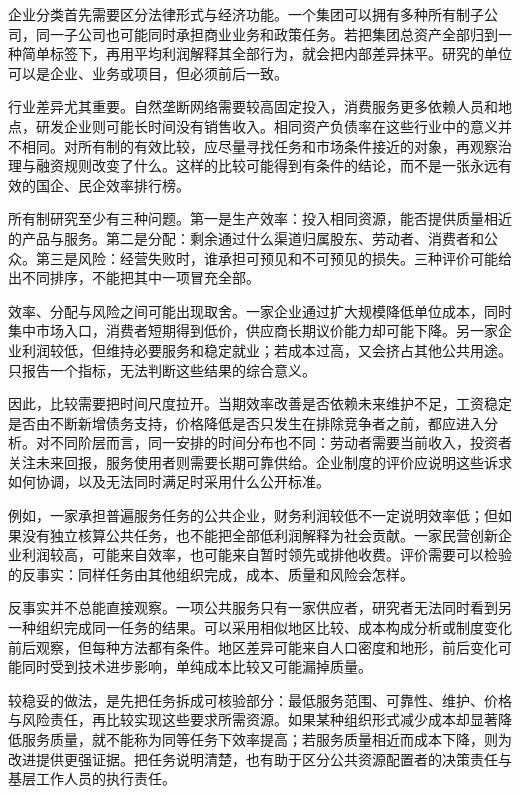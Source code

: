 \documentclass[UTF8,fontset=fandol,zihao=-4,oneside,openany]{ctexbook}
\begin{document}
\label{arg:P076}
企业分类首先需要区分法律形式与经济功能。一个集团可以拥有多种所有制子公司，同一子公司也可能同时承担商业业务和政策任务。若把集团总资产全部归到一种简单标签下，再用平均利润解释其全部行为，就会把内部差异抹平。研究的单位可以是企业、业务或项目，但必须前后一致。

行业差异尤其重要。自然垄断网络需要较高固定投入，消费服务更多依赖人员和地点，研发企业则可能长时间没有销售收入。相同资产负债率在这些行业中的意义并不相同。对所有制的有效比较，应尽量寻找任务和市场条件接近的对象，再观察治理与融资规则改变了什么。这样的比较可能得到有条件的结论，而不是一张永远有效的国企、民企效率排行榜。

所有制研究至少有三种问题。第一是生产效率：投入相同资源，能否提供质量相近的产品与服务。第二是分配：剩余通过什么渠道归属股东、劳动者、消费者和公众。第三是风险：经营失败时，谁承担可预见和不可预见的损失。三种评价可能给出不同排序，不能把其中一项冒充全部。

\label{arg:P077}
效率、分配与风险之间可能出现取舍。一家企业通过扩大规模降低单位成本，同时集中市场入口，消费者短期得到低价，供应商长期议价能力却可能下降。另一家企业利润较低，但维持必要服务和稳定就业；若成本过高，又会挤占其他公共用途。只报告一个指标，无法判断这些结果的综合意义。

因此，比较需要把时间尺度拉开。当期效率改善是否依赖未来维护不足，工资稳定是否由不断新增债务支持，价格降低是否只发生在排除竞争者之前，都应进入分析。对不同阶层而言，同一安排的时间分布也不同：劳动者需要当前收入，投资者关注未来回报，服务使用者则需要长期可靠供给。企业制度的评价应说明这些诉求如何协调，以及无法同时满足时采用什么公开标准。

例如，一家承担普遍服务任务的公共企业，财务利润较低不一定说明效率低；但如果没有独立核算公共任务，也不能把全部低利润解释为社会贡献。一家民营创新企业利润较高，可能来自效率，也可能来自暂时领先或排他收费。评价需要可以检验的反事实：同样任务由其他组织完成，成本、质量和风险会怎样。

\label{arg:P078}
反事实并不总能直接观察。一项公共服务只有一家供应者，研究者无法同时看到另一种组织完成同一任务的结果。可以采用相似地区比较、成本构成分析或制度变化前后观察，但每种方法都有条件。地区差异可能来自人口密度和地形，前后变化可能同时受到技术进步影响，单纯成本比较又可能漏掉质量。

较稳妥的做法，是先把任务拆成可核验部分：最低服务范围、可靠性、维护、价格与风险责任，再比较实现这些要求所需资源。如果某种组织形式减少成本却显著降低服务质量，就不能称为同等任务下效率提高；若服务质量相近而成本下降，则为改进提供更强证据。把任务说明清楚，也有助于区分公共资源配置者的决策责任与基层工作人员的执行责任。
\end{document}

